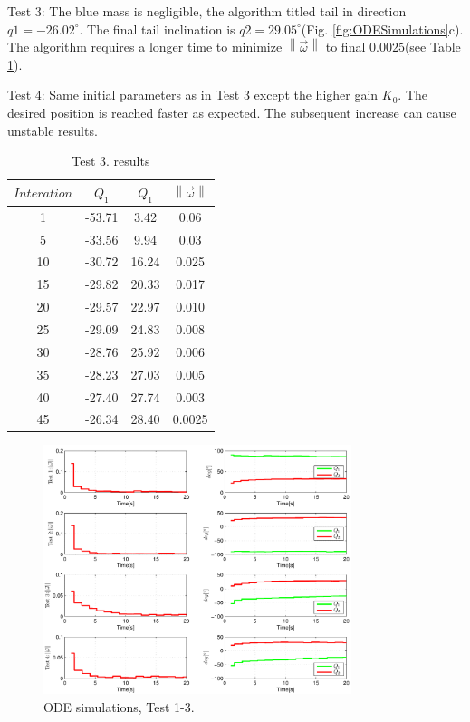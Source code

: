 Test 3: The blue mass is negligible, the algorithm titled tail in direction $q1=-26.02^{\circ}$. The final tail inclination is $q2=29.05^{\circ}$(Fig. \ref{fig:ODESimulations}c). The algorithm requires a longer time to minimize $\left \| \vec{\omega} \right \|$ to final $0.0025$(see Table \ref{tab:Simulations2}).

Test 4: Same initial parameters as in Test 3 except the higher gain $K_0$. The desired position is reached faster as expected. The subsequent increase can cause unstable results. 

\begin{table}
	\centering
\begin{tabular}{|c|c|c|c|}
	\hline
$Interation$ & $Q_1$ & $Q_1$  & $\left \| \vec{\omega} \right \|$\\
	\hline
1 & -53.71 & 3.42 & 0.06\\
5 & -33.56 & 9.94 & 0.03\\
10 & -30.72 & 16.24 &  0.025\\
15 & -29.82 & 20.33 & 0.017\\
20 & -29.57 & 22.97 &  0.010\\
25 & -29.09 & 24.83 &  0.008\\
30 & -28.76 & 25.92 &   0.006\\
35 & -28.23 & 27.03 & 0.005\\
40 & -27.40 & 27.74 &0.003\\
45 & -26.34 & 28.40 &  0.0025\\
\hline
\end{tabular}
\caption{Test 3. results}\label{tab:Simulations2}
\end{table}


\begin{figure}
	\centering
	\includegraphics[width=90mm]{./pictures/ODE_graph.pdf}
	\caption{ODE simulations, Test 1-3.}
	\label{fig:ODE graph}
\end{figure}